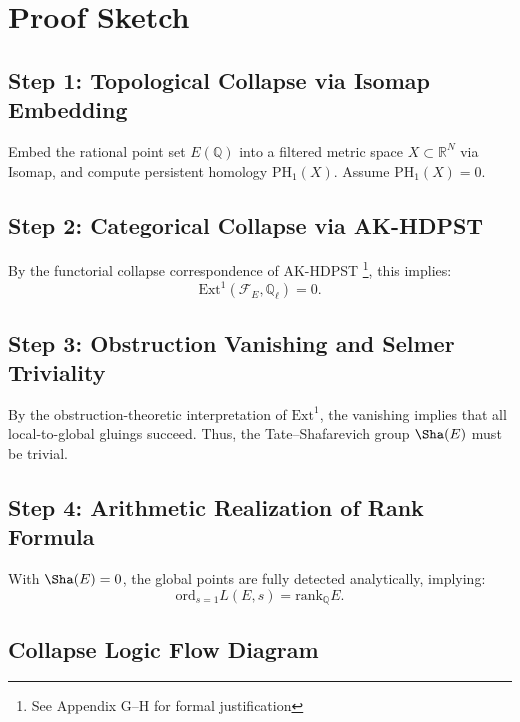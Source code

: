 \documentclass[11pt]{article}
\theoremstyle{definition}
\begin{document}
\section{Proof Sketch}

\subsection{Step 1: Topological Collapse via Isomap Embedding}
Embed the rational point set \( E(\mathbb{Q}) \) into a filtered metric space \( X \subset \mathbb{R}^N \) via Isomap, and compute persistent homology \( \mathrm{PH}_1(X) \).  
Assume \( \mathrm{PH}_1(X) = 0 \).

\subsection{Step 2: Categorical Collapse via AK-HDPST}
By the functorial collapse correspondence of AK-HDPST \footnote{See Appendix G--H for formal justification}, this implies:
\[
\mathrm{Ext}^1(\mathcal{F}_E, \mathbb{Q}_\ell) = 0.
\]

\subsection{Step 3: Obstruction Vanishing and Selmer Triviality}
By the obstruction-theoretic interpretation of \( \mathrm{Ext}^1 \), the vanishing implies that all local-to-global gluings succeed.  
Thus, the Tate--Shafarevich group \( \Sha(E) \) must be trivial.

\subsection{Step 4: Arithmetic Realization of Rank Formula}
With \( \Sha(E) = 0 \), the global points are fully detected analytically, implying:
\[
\mathrm{ord}_{s=1}L(E,s) = \mathrm{rank}_\mathbb{Q}E.
\]

\subsection{Collapse Logic Flow Diagram}
\begin{center}
\end{center}
\end{document}

